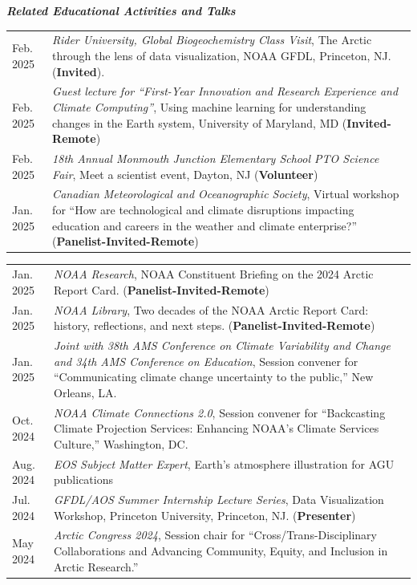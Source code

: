 \documentclass[margin,line,palatino,courier,10pt]{res}
\begin{document}
\begin{resume}
\textit{\textbf{Related Educational Activities and Talks}}
\vspace*{0.05in}\\
\begin{tabular}{@{}p{0.9in}p{4in}}
Feb. 2025 & \textit{Rider University, Global Biogeochemistry Class Visit}, The Arctic through the lens of data visualization, NOAA GFDL, Princeton, NJ. (\textbf{Invited}).\\
Feb. 2025 & \textit{Guest lecture for ``First-Year Innovation and Research Experience and Climate Computing''}, Using machine learning for understanding changes in the Earth system, University of Maryland, MD (\textbf{Invited-Remote})\\
Feb. 2025 & \textit{18th Annual Monmouth Junction Elementary School PTO Science Fair}, Meet a scientist event, Dayton, NJ (\textbf{Volunteer})\\
Jan. 2025 & \textit{Canadian Meteorological and Oceanographic Society}, Virtual workshop for ``How are technological and climate disruptions impacting education and careers in the weather and climate enterprise?'' (\textbf{Panelist-Invited-Remote})\\
\end{tabular}
\begin{tabular}{@{}p{0.9in}p{4in}}
Jan. 2025 & \textit{NOAA Research}, NOAA Constituent Briefing on the 2024 Arctic Report Card. (\textbf{Panelist-Invited-Remote})\\
Jan. 2025 & \textit{NOAA Library}, Two decades of the NOAA Arctic Report Card: history, reflections, and next steps. (\textbf{Panelist-Invited-Remote})\\
Jan. 2025 & \textit{Joint with 38th AMS Conference on Climate Variability and Change and 34th AMS Conference on Education}, Session convener for ``Communicating climate change uncertainty to the public,'' New Orleans, LA.\\ 
Oct. 2024 & \textit{NOAA Climate Connections 2.0}, Session convener for ``Backcasting Climate Projection Services: Enhancing NOAA’s Climate Services Culture,'' Washington, DC.\\ 
Aug. 2024 & \textit{EOS Subject Matter Expert}, Earth's atmosphere illustration for AGU publications\\
Jul. 2024 & \textit{GFDL/AOS Summer Internship Lecture Series}, Data Visualization Workshop, Princeton University, Princeton, NJ. (\textbf{Presenter})\\
May 2024 & \textit{Arctic Congress 2024}, Session chair for ``Cross/Trans-Disciplinary Collaborations and Advancing Community, Equity, and Inclusion in Arctic Research.''\\ 

\end{tabular}
\end{resume}
\end{document}

